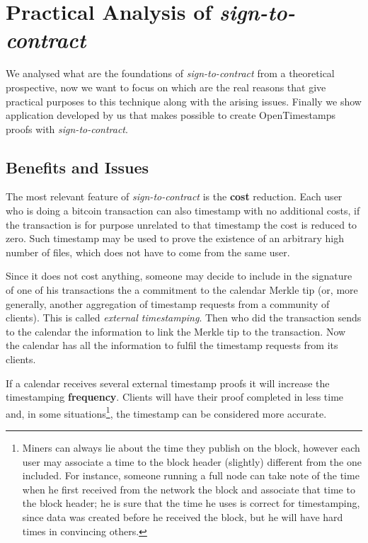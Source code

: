 \chapter{Practical Analysis of \textit{sign-to-contract} }
\label{chpr:s2c}
We analysed what are the foundations of \textit{sign-to-contract} from a theoretical prospective, now we want to focus on which are the real reasons that give practical purposes to this technique along with the arising issues.
Finally we show application developed by us that makes possible to create OpenTimestamps proofs with \textit{sign-to-contract}.

\section{Benefits and Issues}
The most relevant feature of \textit{sign-to-contract} is the \textbf{cost} reduction. Each user who is doing a bitcoin transaction can also timestamp with no additional costs, if the transaction is for purpose unrelated to that timestamp the cost is reduced to zero. Such timestamp may be used to prove the existence of an arbitrary high number of files, which does not have to come from the same user.

Since it does not cost anything, someone may decide to include in the signature of one of his transactions the a commitment to the calendar Merkle tip (or, more generally, another aggregation of timestamp requests from a community of clients). 
This is called \textit{external timestamping}.
Then who did the transaction sends to the calendar the information to link the Merkle tip to the transaction.
Now the calendar has all the information to fulfil the timestamp requests from its clients.

If a calendar receives several external timestamp proofs it will increase the timestamping \textbf{frequency}. Clients will have their proof completed in less time and, in some situations\footnote{Miners can always lie about the time they publish on the block, however each user may associate a time to the block header (slightly) different from the one included. For instance, someone running a full node can take note of the time when he first received from the network the block and associate that time to the block header; he is sure that the time he uses is correct for timestamping, since data was created before he received the block, but he will have hard times in convincing others.}, the timestamp can be considered more accurate.

